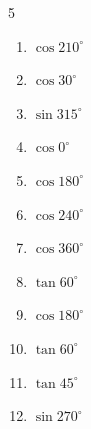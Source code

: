 \begin{multicols}{5}
\begin{enumerate}
        \phantom{$\displaystyle なし$}

  \item $\displaystyle \cos{210^\circ}$


  \item $\displaystyle \cos{30^\circ}$


  \item $\displaystyle \sin{315^\circ}$


  \item $\displaystyle \cos{0^\circ}$

        \phantom{$\displaystyle =1$}

  \item $\displaystyle \cos{180^\circ}$

        \phantom{$\displaystyle =-1$}

  \item $\displaystyle \cos{240^\circ}$


  \item $\displaystyle \cos{360^\circ}$

        \phantom{$\displaystyle =1$}

  \item $\displaystyle \tan{60^\circ}$


\columnbreak %

  \item $\displaystyle \cos{180^\circ}$

        \phantom{$\displaystyle =-1$}

  \item $\displaystyle \tan{60^\circ}$


  \item $\displaystyle \tan{45^\circ}$

        \phantom{$\displaystyle =1$}

  \item $\displaystyle \sin{270^\circ}$

        \phantom{$\displaystyle =-1$}


\end{enumerate}
\end{multicols}
